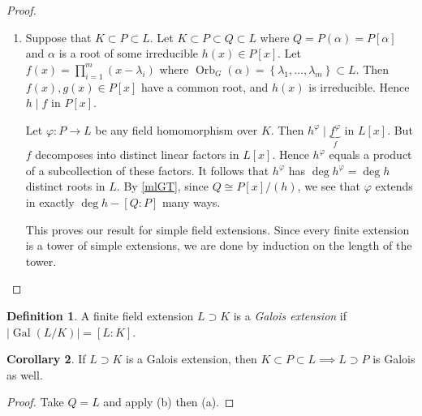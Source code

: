 \documentclass[10pt,letterpaper,cm]{nupset}
\theoremstyle{definition}
\newtheorem{definition}{Definition}[subsection]
\theoremstyle{theorem}
\newtheorem{corollary}[definition]{Corollary}
\newtheorem*{claim}{Claim}
\theoremstyle{remark}
\newcommand{\1}{\mathbf{1}}
\newcommand{\0}{\vec 0}
\DeclareMathOperator{\gal}{Gal}
\DeclareMathOperator{\orb}{Orb}
\begin{document}
\begin{proof}
\begin{enumerate}[label=(\alph*)]
We have shown that $L = \bigcup_{g\in G} L_g$.
\begin{claim}
If $K$ is an infinite field and $V$ is a finite-dimensional $K$-vector space and $V_1, V_2, \ldots, V_g \subset V$ are subspaces, then $V= \bigcup_{i=1}^g V_i \implies V = V_k$ for some $k$.
\end{claim}
\begin{proof}
Suppose that each $V_i \subsetneq V$ and that $V= \bigcup_{i=1}^g V_i $. Then there exists a linear map $f_i : V \to K$ such that $f_i \restriction_{V_i} =0$ and $f_i \ne 0$. Then $f: V \to K$ given by $f = \prod_{i=1}^kf_i$ is the function associates with a nonzero polynomial in $V= K^n$ of degree $s$.  But $f$ is the zero function since $V = \bigcup_{i=1}^k V_i$, a contradiction.
\end{proof}
\item  Suppose that $K \subset P \subset L$. Let $K \subset P \subset Q \subset L$ where $Q = P(\alpha) = P[\alpha]$ and $\alpha$ is a root of some irreducible $h(x) \in P[x]$. Let $f(x) = \prod_{i=1}^m (x-\lambda_i)$ where $\orb_G(\alpha) = \left\{\lambda_1, \ldots, \lambda_m\right\} \subset L$. Then $f(x), g(x) \in P[x]$ have a common root, and $h(x)$ is irreducible. Hence $h\mid f$ in $P[x]$.

Let $\varphi : P \to L$ be any field homomorphism over $K$.  Then $h^{\varphi}\mid \underbrace{f^{\varphi}}_{f}$ in $L[x]$. But $f$ decomposes into distinct linear factors in $L[x]$. Hence $h^{\varphi}$ equals a product of a subcollection of these factors.  It follows that $h^{\varphi}$ has $\deg{h^{\varphi}}= \deg{h}$ distinct roots in $L$. By \cref{mlGT}, since $Q \cong P[x]/(h)$, we see that $\varphi$ extends in exactly $\deg{h} - [Q:P]$ many ways. 

This proves our result for simple field extensions. Since every finite extension is a tower of simple extensions, we are done by induction on the length of the tower. 
\end{enumerate}
\end{proof}

\begin{definition}
A finite field extension $L \supset K$ is a \textit{Galois extension} if $\left\lvert{\gal(L/K)}\right\rvert = [L:K]$.
\end{definition}

\begin{corollary}\label{cor16}
If $L\supset K$ is a Galois extension, then $K \subset P \subset L \implies L\supset P$ is Galois as well.
\end{corollary}
\begin{proof}
Take $Q= L$ and apply (b) then (a).
\end{proof}
\end{document}
